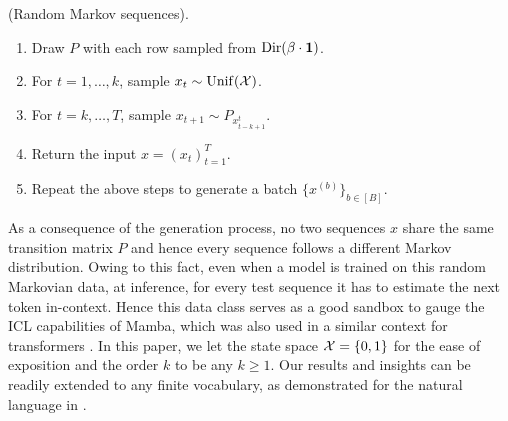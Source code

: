  (Random Markov sequences).
\vspace{-0.5em}
    \begin{enumerate}
        \item Draw $P$ with each row sampled \iid from $\mathrm{Dir}(\beta \cdot \bm{1})$. \vspace{-0.5em}
        \item For $t=1,\ldots,k$, sample $x_t \sim \mathrm{Unif}(\mathcal{X})$.
        \vspace{-0.5em}
        \item For $t=k, \ldots, T$, sample $x_{t+1} \sim P_{x_{t-k+1}^t} $.
        \vspace{-0.5em}
        \item Return the input $x=(x_t)_{t=1}^T$.
              \vspace{-0.5em}
        \item Repeat the above steps to generate a batch $\{x^{(b)}\}_{b \in [B]}$.
    \end{enumerate}

 As a consequence of the generation process, no two sequences $x$ share the same transition matrix $P$ and hence every sequence follows a different Markov distribution. Owing to this fact, even when a model is trained on this random Markovian data, at inference, for every test sequence it has to estimate the next token in-context. Hence this data class serves as a good sandbox to gauge the ICL capabilities of Mamba, which was also used in a similar context for transformers \cite{nic2024trans}. In this paper, we let the state space $\mathcal{X} = \{0,1\}$ for the ease of exposition and the order $k$ to be any $k \geq 1$. Our results and insights can be readily extended to any finite vocabulary, as demonstrated for the natural language in .



%     


